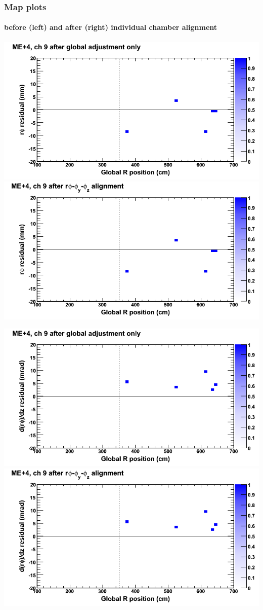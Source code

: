 \documentclass[compress]{beamer}
\begin{document}
\begin{frame}
\frametitle{Map plots}
\framesubtitle{before (left) and after (right) individual chamber alignment}
\includegraphics[width=0.5\linewidth]{ringmapplots_3dof/before_CSCvsr_mep4ch09_x.png} \includegraphics[width=0.5\linewidth]{ringmapplots_3dof/after_CSCvsr_mep4ch09_x.png}

\includegraphics[width=0.5\linewidth]{ringmapplots_3dof/before_CSCvsr_mep4ch09_dxdz.png} \includegraphics[width=0.5\linewidth]{ringmapplots_3dof/after_CSCvsr_mep4ch09_dxdz.png}
\end{frame}
\end{document}
